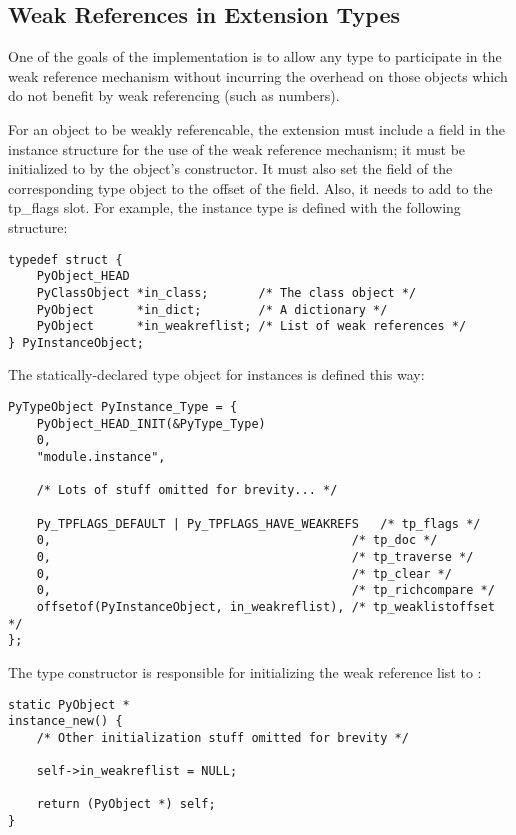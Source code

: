 \subsection{Weak References in Extension Types
            \label{weakref-extension}}

One of the goals of the implementation is to allow any type to
participate in the weak reference mechanism without incurring the
overhead on those objects which do not benefit by weak referencing
(such as numbers).

For an object to be weakly referencable, the extension must include a
 field in the instance structure for the use of the
weak reference mechanism; it must be initialized to \NULL{} by the
object's constructor.  It must also set the 
field of the corresponding type object to the offset of the field.
Also, it needs to add  to the
tp_flags slot.  For example, the instance type is defined with the
following structure:

\begin{verbatim}
typedef struct {
    PyObject_HEAD
    PyClassObject *in_class;       /* The class object */
    PyObject      *in_dict;        /* A dictionary */
    PyObject      *in_weakreflist; /* List of weak references */
} PyInstanceObject;
\end{verbatim}

The statically-declared type object for instances is defined this way:

\begin{verbatim}
PyTypeObject PyInstance_Type = {
    PyObject_HEAD_INIT(&PyType_Type)
    0,
    "module.instance",

    /* Lots of stuff omitted for brevity... */

    Py_TPFLAGS_DEFAULT | Py_TPFLAGS_HAVE_WEAKREFS   /* tp_flags */
    0,                                          /* tp_doc */
    0,                                          /* tp_traverse */
    0,                                          /* tp_clear */
    0,                                          /* tp_richcompare */
    offsetof(PyInstanceObject, in_weakreflist), /* tp_weaklistoffset */
};
\end{verbatim}

The type constructor is responsible for initializing the weak reference
list to \NULL:

\begin{verbatim}
static PyObject *
instance_new() {
    /* Other initialization stuff omitted for brevity */

    self->in_weakreflist = NULL;

    return (PyObject *) self;
}
\end{verbatim}

